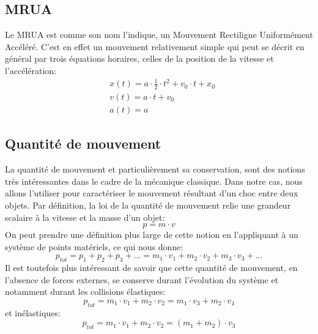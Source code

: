\subsection{MRUA}
Le MRUA est comme son nom l'indique, un Mouvement Rectiligne Uniformément Accéléré. C'est en effet un mouvement relativement simple qui peut se décrit en général par trois équations horaires, celles de la position de la vitesse et l'accélération:
\begin{align}
    & x(t) = a\cdot \frac{1}{2} \cdot t^2 + v_0 \cdot t + x_0 \\
    & v(t) = a \cdot t + v_0 \\
    & a(t) = a
\end{align}

\subsection{Quantité de mouvement}
La quantité de mouvement et particulièrement sa conservation, sont des notions très intéressantes dans le cadre de la mécanique classique. Dans notre cas, nous allons l'utiliser pour caractériser le mouvement résultant d'un choc entre deux objets.
Par définition, la loi de la quantité de mouvement relie une grandeur scalaire à la vitesse et la masse d'un objet:
\begin{equation}
    p = m \cdot v
\end{equation}
On peut prendre une définition plus large de cette notion en l'appliquant à un système de points matériels, ce qui nous donne:
\begin{equation}
    p_{tot} = p_1 + p_2 + p_3 + ... = m_1 \cdot v_1 + m_2 \cdot v_2 + m_3 \cdot v_3 + ...
\end{equation}
Il est toutefois plus intéressant de savoir que cette quantité de mouvement, en l'absence de forces externes, se conserve durant l'évolution du système et notamment durant les collisions élastiques:
\begin{equation}
    p_{tot} = m_1 \cdot v_1 + m_2 \cdot v_2 = m_1 \cdot v_3 + m_2 \cdot v_4
\end{equation}
et inélastiques:
\begin{equation}
    p_{tot} = m_1 \cdot v_1 + m_2 \cdot v_2 = (m_1 + m_2) \cdot v_3
\end{equation}
